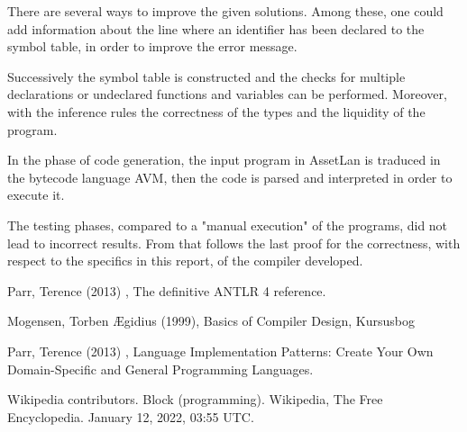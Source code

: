 \documentclass[11pt]{article} %
\begin{document}
\medskip

There are several ways to improve the given solutions. Among these, one could add information about the line where an identifier has been declared to the symbol table, in order to improve the error message. %

\medskip

Successively the symbol table is constructed and the checks for multiple declarations or undeclared functions and variables can be performed. Moreover, with the inference rules the correctness of the types and the liquidity of the program. 

\medskip

In the phase of code generation, the input program in AssetLan is traduced in the bytecode language AVM, then the code is parsed and interpreted in order to execute it.

\medskip

The testing phases, compared to a "manual execution" of the programs,  did not lead to incorrect results. From that follows the last proof for the correctness, with respect to the specifics in this report, of the compiler developed.


\clearpage

\begin{thebibliography}{9}
Parr, Terence (2013) , The definitive ANTLR 4 reference.

Mogensen, {Torben {\AE}gidius} (1999), Basics of Compiler Design, Kursusbog 

Parr, Terence (2013) , Language Implementation Patterns: Create Your Own Domain-Specific and General Programming Languages.

Wikipedia contributors. Block (programming). Wikipedia, The Free Encyclopedia. January 12, 2022, 03:55 UTC. 
\end{thebibliography}
\end{document}
